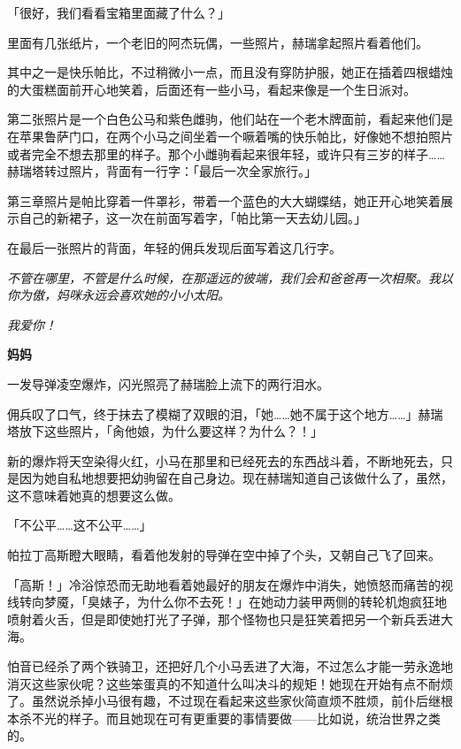 「很好，我们看看宝箱里面藏了什么？」

里面有几张纸片，一个老旧的阿杰玩偶，一些照片，赫瑞拿起照片看着他们。

其中之一是快乐帕比，不过稍微小一点，而且没有穿防护服，她正在插着四根蜡烛的大蛋糕面前开心地笑着，后面还有一些小马，看起来像是一个生日派对。

第二张照片是一个白色公马和紫色雌驹，他们站在一个老木牌面前，看起来他们是在苹果鲁萨门口，在两个小马之间坐着一个噘着嘴的快乐帕比，好像她不想拍照片或者完全不想去那里的样子。那个小雌驹看起来很年轻，或许只有三岁的样子……赫瑞塔转过照片，背面有一行字：「最后一次全家旅行。」

第三章照片是帕比穿着一件罩衫，带着一个蓝色的大大蝴蝶结，她正开心地笑着展示自己的新裙子，这一次在前面写着字，「帕比第一天去幼儿园。」

在最后一张照片的背面，年轻的佣兵发现后面写着这几行字。

\medskip

\emph{不管在哪里，不管是什么时候，在那遥远的彼端，我们会和爸爸再一次相聚。我以你为傲，妈咪永远会喜欢她的小小太阳。}

\emph{我爱你！}

\begin{flushright}
    \textbf{妈妈}
\end{flushright}

\medskip

一发导弹凌空爆炸，闪光照亮了赫瑞脸上流下的两行泪水。

佣兵叹了口气，终于抹去了模糊了双眼的泪，「她……她不属于这个地方……」赫瑞塔放下这些照片，「肏他娘，为什么要这样？为什么？！」

新的爆炸将天空染得火红，小马在那里和已经死去的东西战斗着，不断地死去，只是因为她自私地想要把幼驹留在自己身边。现在赫瑞知道自己该做什么了，虽然，这不意味着她真的想要这么做。

「不公平……这不公平……」

\horizonline

帕拉丁高斯瞪大眼睛，看着他发射的导弹在空中掉了个头，又朝自己飞了回来。

「高斯！」冷浴惊恐而无助地看着她最好的朋友在爆炸中消失，她愤怒而痛苦的视线转向梦魇，「臭婊子，为什么你不去死！」在她动力装甲两侧的转轮机炮疯狂地喷射着火舌，但是即使她打光了子弹，那个怪物也只是狂笑着把另一个新兵丢进大海。

怕音已经杀了两个铁骑卫，还把好几个小马丢进了大海，不过怎么才能一劳永逸地消灭这些家伙呢？这些笨蛋真的不知道什么叫决斗的规矩！她现在开始有点不耐烦了。虽然说杀掉小马很有趣，不过现在看起来这些家伙简直烦不胜烦，前仆后继根本杀不光的样子。而且她现在可有更重要的事情要做——比如说，统治世界之类的。

